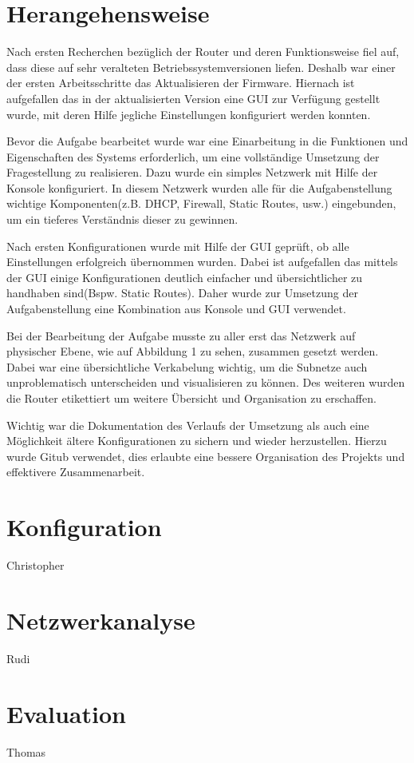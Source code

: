 \documentclass[10pt,a4paper]{article}
\begin{document}
\section{Herangehensweise}
Nach ersten Recherchen bezüglich der Router und deren
Funktionsweise fiel auf, dass diese auf sehr veralteten
Betriebssystemversionen liefen. Deshalb war einer der ersten
Arbeitsschritte das Aktualisieren der Firmware. Hiernach ist
aufgefallen das in der aktualisierten Version eine GUI zur
Verfügung gestellt wurde, mit deren Hilfe jegliche
Einstellungen konfiguriert werden konnten.
\par
Bevor die Aufgabe bearbeitet wurde war eine Einarbeitung in die
Funktionen und Eigenschaften des Systems erforderlich, um eine
vollständige Umsetzung der Fragestellung zu realisieren. Dazu wurde
ein simples Netzwerk mit Hilfe der Konsole konfiguriert. In diesem
Netzwerk wurden alle für die Aufgabenstellung wichtige
Komponenten(z.B. DHCP, Firewall, Static Routes, usw.) eingebunden, um
ein tieferes Verständnis dieser zu gewinnen.
\par
Nach ersten Konfigurationen wurde mit Hilfe der GUI geprüft, ob alle
Einstellungen erfolgreich übernommen wurden. Dabei ist aufgefallen das
mittels der GUI einige Konfigurationen deutlich einfacher und
übersichtlicher zu handhaben sind(Bspw. Static Routes). Daher wurde
zur Umsetzung der Aufgabenstellung eine Kombination aus Konsole und
GUI verwendet.
\par
Bei der Bearbeitung der Aufgabe musste zu aller erst das Netzwerk auf
physischer Ebene, wie auf Abbildung 1 zu sehen, zusammen gesetzt
werden. Dabei war eine übersichtliche Verkabelung wichtig, um die
Subnetze auch unproblematisch unterscheiden und visualisieren zu
können. Des weiteren wurden die Router etikettiert um weitere
Übersicht und Organisation zu erschaffen.
\par
Wichtig war die Dokumentation des Verlaufs der Umsetzung als auch eine
Möglichkeit ältere Konfigurationen zu sichern und wieder
herzustellen. Hierzu wurde Gitub verwendet, dies erlaubte eine bessere
Organisation des Projekts und effektivere Zusammenarbeit.


\section{Konfiguration}Christopher


\section{Netzwerkanalyse}Rudi


\section{Evaluation}Thomas
\end{document}
